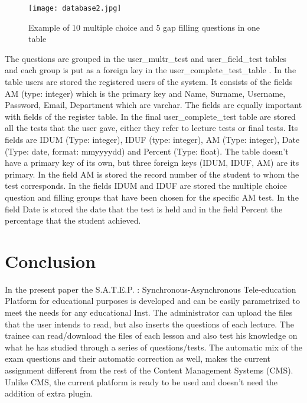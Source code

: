 \documentclass[10pt, conference, compsocconf]{IEEEtran}
\begin{document}
\begin{figure}[!h]
	\centering
	\texttt{[image: database2.jpg]}
	\caption{Example of 10 multiple choice and 5 gap filling questions in one table}
\end{figure}


The questions are grouped in the user\_multr\_test and user\_field\_test tables and each group is put as a foreign key in the user\_complete\_test\_table .   In the table users are stored the registered users of the system. It consists of the fields AM (type: integer) which is the primary key and Name, Surname, Username, Password, Email, Department which are varchar. The fields are equally important with fields of the register table.    In the final user\_complete\_test table are stored all the tests that the user gave, either they refer to lecture tests or final tests. Its fields are IDUM (Type: integer), IDUF (type: integer), AM (Type: integer), Date (Type: date, format: mm\-yyyy\-dd) and Percent (Type: float). The table doesn’t have a primary key of its own, but three foreign keys (IDUM, IDUF, AM) are its primary. In the field AM is stored the record number of the student to whom the test corresponds. In the fields IDUM and IDUF are stored the multiple choice question and filling groups that have been chosen for the specific AM test. In the field Date is stored the date that the test is held and in the field Percent the percentage that the student achieved.




\section{Conclusion}
 In the present paper the  S.A.T.E.P. : Synchronous-Asynchronous Tele-education Platform  for educational purposes is developed and can be easily parametrized  to meet the needs for any educational Inst. The administrator can  upload  the files that the user intends to read, but also inserts the questions of each lecture. The trainee can read/download the files of each lesson and also test his knowledge on what he has studied through a series of questions/tests. The automatic mix of the exam questions and their automatic correction as well, makes the current assignment different from the rest of the Content Management Systems (CMS). Unlike CMS, the current platform is ready to be used   and doesn’t need the addition of extra plugin.
\end{document}
